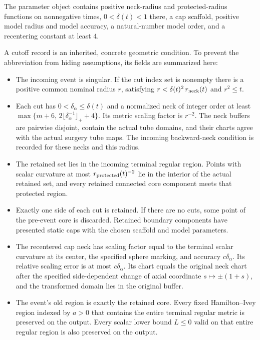 \documentclass[
  letterpaper,
  11pt]{article}
\providecommand{\tightlist}{%
  \setlength{\itemsep}{0pt}\setlength{\parskip}{0pt}}
\begin{document}
The parameter object contains positive neck-radius and protected-radius
functions on nonnegative times, \(0<\delta(t)<1\) there, a cap scaffold,
positive model radius and model accuracy, a natural-number model order,
and a recentering constant at least \(4\).

A cutoff record is an inherited, concrete geometric condition. To
prevent the abbreviation from hiding assumptions, its fields are
summarized here:

\begin{itemize}
\tightlist
\item
  The incoming event is singular. If the cut index set is nonempty there
  is a positive common nominal radius \(r\), satisfying
  \(r<\delta(t)^2\,r_{\rm neck}(t)\) and \(r^2\leq t\).
\item
  Each cut has \(0<\delta_\alpha\leq\delta(t)\) and a normalized neck of
  integer order at least
  \(\max\{m+6,\,2\lfloor\delta_\alpha^{-1}\rfloor_++4\}\). Its metric
  scaling factor is \(r^{-2}\). The neck buffers are pairwise disjoint,
  contain the actual tube domains, and their charts agree with the
  actual surgery tube maps. The incoming backward-neck condition is
  recorded for these necks and this radius.
\item
  The retained set lies in the incoming terminal regular region. Points
  with scalar curvature at most \(r_{\rm protected}(t)^{-2}\) lie in the
  interior of the actual retained set, and every retained connected core
  component meets that protected region.
\item
  Exactly one side of each cut is retained. If there are no cuts, some
  point of the pre-event core is discarded. Retained boundary components
  have presented static caps with the chosen scaffold and model
  parameters.
\item
  The recentered cap neck has scaling factor equal to the terminal
  scalar curvature at its center, the specified sphere marking, and
  accuracy \(c\delta_\alpha\). Its relative scaling error is at most
  \(c\delta_\alpha\). Its chart equals the original neck chart after the
  specified side-dependent change of axial coordinate
  \(s\mapsto\pm(1+s)\), and the transformed domain lies in the original
  buffer.
\item
  The event's old region is exactly the retained core. Every fixed
  Hamilton--Ivey region indexed by \(a>0\) that contains the entire
  terminal regular metric is preserved on the output. Every scalar lower
  bound \(L\leq0\) valid on that entire regular region is also preserved
  on the output.
\end{itemize}
\end{document}

